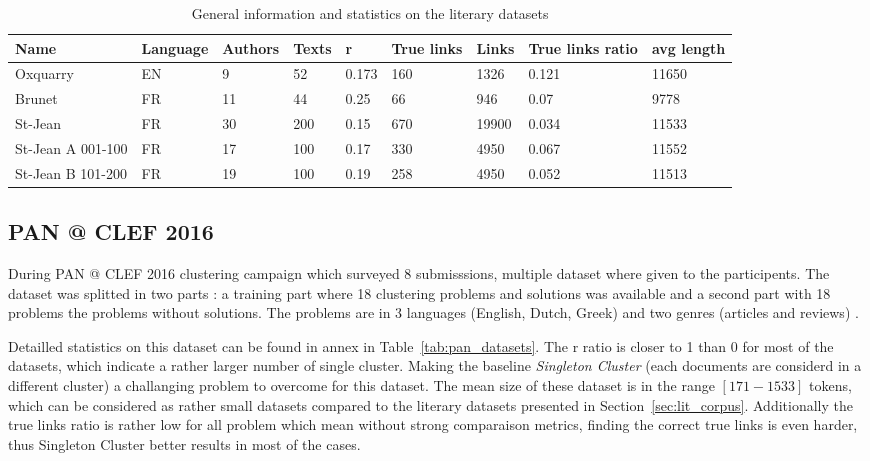 \begin{table}[t]
  \caption{General information and statistics on the literary datasets}
  \label{tab:lit_datasets}
  \begin{tabular}{|l|l|l|l|l|l|l|l|l|}
    \hline
    \textbf{Name} &
    \textbf{Language} &
    \textbf{Authors} &
    \textbf{Texts} &
    \textbf{r} &
    \textbf{True links} &
    \textbf{Links} &
    \textbf{True links ratio} &
    \textbf{avg length} \\ \hline
    Oxquarry & EN & 9 & 52 & 0.173 & 160 & 1326 & 0.121 & 11650 \\ \hline
    Brunet & FR & 11 & 44 & 0.25 & 66 & 946 & 0.07 & 9778 \\ \hline
    St-Jean & FR & 30 & 200 & 0.15 & 670 & 19900 & 0.034 & 11533 \\ \hline
    St-Jean A 001-100 & FR & 17 & 100 & 0.17 & 330 & 4950 & 0.067 & 11552 \\ \hline
    St-Jean B 101-200 & FR & 19 & 100 & 0.19 & 258 & 4950 & 0.052 & 11513 \\ \hline
  \end{tabular}
\end{table}


\subsection{PAN @ CLEF 2016}

During PAN @ CLEF 2016 clustering campaign which surveyed 8 submisssions, multiple dataset where given to the participents.
The dataset was splitted in two parts : a training part where 18 clustering problems and solutions was available and a second part with 18 problems the problems without solutions.
The problems are in 3 languages (English, Dutch, Greek) and two genres (articles and reviews) \cite{pan16}.

Detailled statistics on this dataset can be found in annex in Table~\ref{tab:pan_datasets}.
The r ratio is closer to 1 than 0 for most of the datasets, which indicate a rather larger number of single cluster.
Making the baseline \textit{Singleton Cluster} (each documents are considerd in a different cluster) a challanging problem to overcome for this dataset.
The mean size of these dataset is in the range $[171-1533]$ tokens, which can be considered as rather small datasets compared to the literary datasets presented in Section~\ref{sec:lit_corpus}.
Additionally the true links ratio is rather low for all problem which mean without strong comparaison metrics, finding the correct true links is even harder, thus Singleton Cluster better results in most of the cases.

